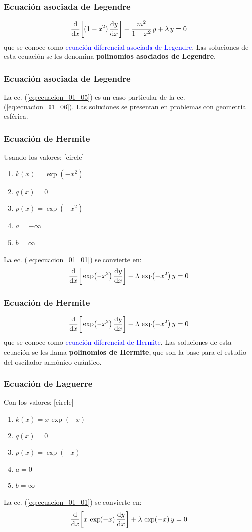 \documentclass[12pt]{beamer}
\begin{document}
\begin{frame}
\frametitle{Ecuación asociada de Legendre}
\begin{align*}
\dv{x} \bigg[ (1 - x^{2}) \, \dv{y}{x} \bigg] - \dfrac{m^{2}}{1 - x^{2}} \, y + \lambda \, y = 0
\end{align*}
\pause
que se conoce como \textcolor{blue}{ecuación diferencial asociada de Legendre}. \pause Las soluciones de esta ecuación se les denomina \textbf{polinomios asociados de Legendre}.
\end{frame}
\begin{frame}
\frametitle{Ecuación asociada de Legendre}
La ec. (\ref{eq:ecuacion_01_05}) es un caso particular de la ec. (\ref{eq:ecuacion_01_06}). \pause Las soluciones se presentan en problemas con geometría esférica.
\end{frame}
\begin{frame}
\frametitle{Ecuación de Hermite}
Usando los valores:
[circle]
\begin{enumerate}[<+->]
\item $k(x) = \exp(-x^{2})$
\item $q(x) = 0$
\item $p(x) = \exp(-x^{2})$
\item $a = -\infty$
\item $b = \infty$
\end{enumerate}
\pause
La ec. (\ref{eq:ecuacion_01_01}) se convierte en:
\begin{align}
\dv{x} \bigg[ \exp(-x^{2}) \, \dv{y}{x} \bigg] + \lambda \, \exp(-x^{2}) \, y = 0
\label{eq:ecuacion_01_07}
\end{align}
\end{frame}
\begin{frame}
\frametitle{Ecuación de Hermite}
\begin{align*}
\dv{x} \bigg[ \exp(-x^{2}) \, \dv{y}{x} \bigg] + \lambda \, \exp(-x^{2}) \, y = 0
\end{align*}
\pause
que se conoce como \textcolor{blue}{ecuación diferencial de Hermite}. \pause Las soluciones de esta ecuación se les llama \textbf{polinomios de Hermite}, que son la base para el estudio del oscilador armónico cuántico.
\end{frame}
\begin{frame}
\frametitle{Ecuación de Laguerre}
Con los valores:
[circle]
\begin{enumerate}[<+->]
\item $k(x) = x \, \exp(-x)$
\item $q(x) = 0$
\item $p(x) = \exp(-x)$
\item $a = 0$
\item $b = \infty$
\end{enumerate}
\pause
La ec. (\ref{eq:ecuacion_01_01}) se convierte en:
\begin{align}
\dv{x} \bigg[ x \, \exp(-x) \, \dv{y}{x} \bigg] + \lambda \, \exp(-x) \, y = 0
\label{eq:ecuacion_01_08}
\end{align}
\end{frame}
\end{document}
